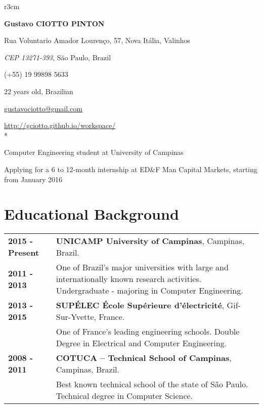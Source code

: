\documentclass[10pt, a4paper]{article}
\author{Gustavo Ciotto Pinton}
\begin{document}
\pagestyle{empty} 

\begin{wrapfigure}{r}{3cm}
  \vspace{-20pt}
  \begin{center}
  \end{center}
\end{wrapfigure}

\textbf{\LARGE Gustavo CIOTTO PINTON}

Rua Voluntario Amador Lourenço, 57, Nova Itália, Valinhos

\textit{CEP 13271-393}, São Paulo, Brazil

(+55) 19 99898 5633	

22 years old, Brazilian

\url{gustavociotto@gmail.com} 

\url{http://gciotto.github.io/workspace/}\\*

{\centerline {\large Computer Engineering student at University of Campinas}} 

{\centerline {Applying for a 6 to 12-month internship at ED\&F Man Capital
Markets, starting from January 2016} }



\section{Educational Background}

\begin{tabular}{p{} p{}}

 \textbf{2015 - Present} & \textbf{UNICAMP University of
 Campinas}, Campinas, Brazil.
 \\
 \textbf{2011 - 2013} & One of Brazil’s major universities with large and
 internationally known research activities. Undergraduate -  majoring in
 Computer Engineering.
 \\

 \textbf{2013 - 2015} & \textbf{SUPÉLEC  École Supérieure d'électricité},
 Gif-Sur-Yvette, France. \\
 & One of France's leading engineering schools. Double Degree
 in Electrical and Computer Engineering. \\

 
 \textbf{2008 - 2011} & \textbf{COTUCA – Technical School of Campinas},
 Campinas, Brazil. \\
 & Best known technical school of the state of São Paulo. Technical degree in
 Computer Science.  \\
\end{tabular}
\end{document}
